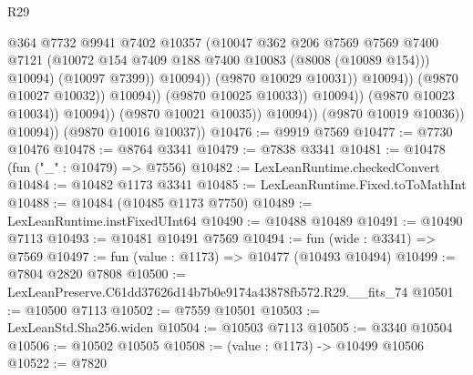 \begin{lexlean}{R29}
\begin{coremodule}
                                                @364
                                                @7732
                                                @9941
                                                @7402
                                                @10357
                                                (@10047
                                                  @362
                                                  @206
                                                  @7569
                                                  @7569
                                                  @7400
                                                  @7121
                                                  (@10072
                                                    @154
                                                    @7409
                                                    @188
                                                    @7400
                                                    @10083
                                                    (@8008 (@10089 @154)))
                                                  @10094)
                                                (@10097 @7399))
                                              @10094))
                                          (@9870 @10029 @10031))
                                        @10094))
                                    (@9870 @10027 @10032))
                                  @10094))
                              (@9870 @10025 @10033))
                            @10094))
                        (@9870 @10023 @10034))
                      @10094))
                  (@9870 @10021 @10035))
                @10094))
            (@9870 @10019 @10036))
          @10094))
      (@9870 @10016 @10037))
@10476 := @9919 @7569
@10477 := @7730 @10476
@10478 := @8764 @3341
@10479 := @7838 @3341
@10481 := @10478 (fun ("_" : @10479) => @7556)
@10482 := LexLeanRuntime.checkedConvert
@10484 := @10482 @1173 @3341
@10485 := LexLeanRuntime.Fixed.toToMathInt
@10488 := @10484 (@10485 @1173 @7750)
@10489 := LexLeanRuntime.instFixedUInt64
@10490 := @10488 @10489
@10491 := @10490 @7113
@10493 := @10481 @10491 @7569
@10494 := fun (wide : @3341) => @7569
@10497 := fun (value : @1173) => @10477 (@10493 @10494)
@10499 := @7804 @2820 @7808
@10500 := LexLeanPreserve.C61dd37626d14b7b0e9174a43878fb572.R29.__fits_74
@10501 := @10500 @7113
@10502 := @7559 @10501
@10503 := LexLeanStd.Sha256.widen
@10504 := @10503 @7113
@10505 := @3340 @10504
@10506 := @10502 @10505
@10508 := (value : @1173) -> @10499 @10506
@10522 := @7820

\end{coremodule}
\end{lexlean}

